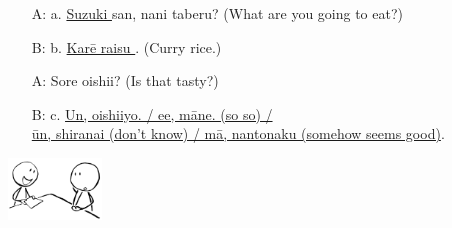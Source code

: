 \documentclass[uplatex,dvipdfmx,b5paper,english,10pt]{jsbook}
\begin{document}
\begin{itemize}
 \item[A:] a. \underline{ Suzuki } san, nani taberu? (What are you going to eat?)
 \item[B:] b. \underline{ Kar\=e raisu }. (Curry rice.)
 \item[A:] Sore oishii? (Is that tasty?)
 \item[B:] c. \underline{ Un, oishiiyo. / ee, m\=ane. (so so) /}\\\hspace{1.1em}\underline{  \=un, shiranai (don't know) / m\=a, nantonaku (somehow seems good)}.
\end{itemize}

\begin{flushright}
\vspace{-6\baselineskip}
\includegraphics[trim=0 0 0 0, clip, angle=0, width=25mm]{img/Japanese-food-menu.png}
\vspace{2\baselineskip}
\end{flushright}
\end{document}
